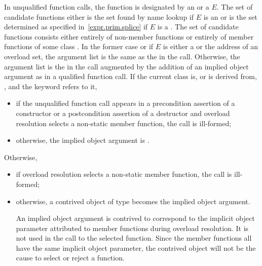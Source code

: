 \pnum
In unqualified function calls, the function is designated by
an  or a  $E$.
The set of candidate functions either
is the set found by name lookup
if $E$ is an  or
is the set determined as specified in~\ref{expr.prim.splice}
if $E$ is a .
The set of candidate functions
consists either entirely of non-member functions or entirely of
member functions of some class
.
In the former case or
if $E$ is either a  or
the address of an overload set,
the argument list is
the same as the
in the call.
Otherwise, the argument list is the
in the call augmented by the addition of an implied object
argument as in a qualified function call.
If the current class is, or is derived from, , and the keyword
 refers to it,
\begin{itemize}
\item
if the unqualified function call
appears in a precondition assertion of a constructor
or a postcondition assertion of a destructor
and overload resolution selects a non-static member function,
the call is ill-formed;
\item
otherwise,
the implied object argument is
.
\end{itemize}
Otherwise,
\begin{itemize}
\item
if overload resolution selects a non-static member function,
the call is ill-formed;
\item
otherwise,
a contrived object of type
becomes the implied object argument.
\begin{footnote}
An implied object argument is contrived to
correspond to the implicit object
parameter attributed to member functions during overload resolution.
It is not
used in
the call to the selected function.
Since the member functions all have the
same implicit
object parameter, the contrived object will not be the cause to select or
reject a
function.
\end{footnote}
\end{itemize}

